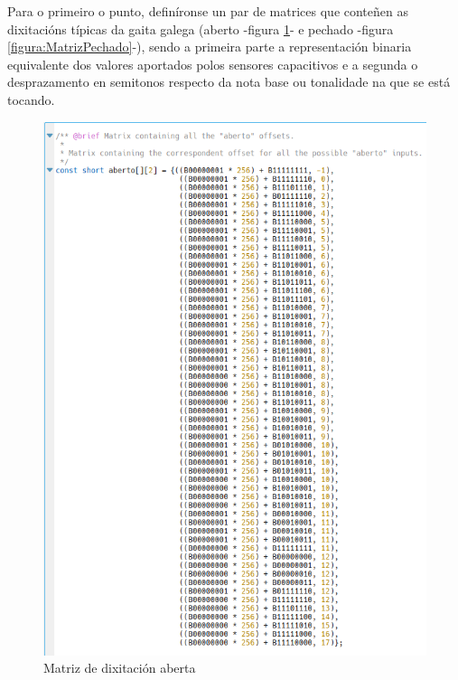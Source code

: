    Para o primeiro o punto, definíronse un par de matrices que conteñen as
   dixitacións típicas da gaita galega (aberto -figura
   \ref{figura:MatrizAberto}- e pechado -figura \ref{figura:MatrizPechado}-),
   sendo a primeira parte a representación binaria equivalente dos valores
   aportados polos sensores capacitivos e a segunda o desprazamento en semitonos
   respecto da nota base ou tonalidade na que se está tocando. \\
   
   \begin{figure}[htbp]
    \centering
    \includegraphics[scale=0.6, keepaspectratio=true]{./imagenes/matriz-aberto.png}
    \caption{Matriz de dixitación aberta}
    \label{figura:MatrizAberto}
   \end{figure}
   
